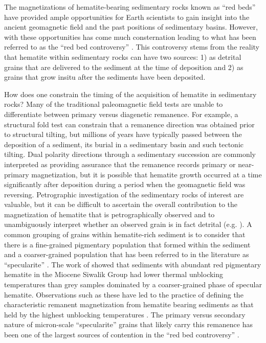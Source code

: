 \documentclass[11pt,letterpaper]{article}
\begin{document}
The magnetizations of hematite-bearing sedimentary rocks known as ``red beds'' have provided ample opportunities for Earth scientists to gain insight into the ancient geomagnetic field and the past positions of sedimentary basins. However, with these opportunities has come much consternation leading to what has been referred to as the ``red bed controversy'' \citep{Butler1992a, Beck2003b, Van-Der-Voo2012a}. This controversy stems from the reality that hematite within sedimentary rocks can have two sources: 1) as detrital grains that are delivered to the sediment at the time of deposition and 2) as grains that grow insitu after the sediments have been deposited.

How does one constrain the timing of the acquisition of hematite in sedimentary rocks? Many of the traditional paleomagnetic field tests are unable to differentiate between primary versus diagenetic remanence. For example, a structural fold test can constrain that a remanence direction was obtained prior to structural tilting, but millions of years have typically passed between the deposition of a sediment, its burial in a sedimentary basin and such tectonic tilting. Dual polarity directions through a sedimentary succession are commonly interpreted as providing assurance that the remanence records primary or near-primary magnetization, but it is possible that hematite growth occurred at a time significantly after deposition during a period when the geomagnetic field was reversing. Petrographic investigation of the sedimentary rocks of interest are valuable, but it can be difficult to ascertain the overall contribution to the magnetization of hematite that is petrographically observed and to unambiguously interpret whether an observed grain is in fact detrital (e.g. \citealp{Elmore1982a}). A common grouping of grains within hematite-rich sediment is to consider that there is a fine-grained pigmentary population that formed within the sediment and a coarser-grained population that has been referred to in the literature as ``specularite'' \citep{Butler1992a, Van-Der-Voo2012a}. The work of \cite{Tauxe1980a} showed that sediments with abundant red pigmentary hematite in the Miocene Siwalik Group had lower thermal unblocking temperatures than grey samples dominated by a coarser-grained phase of specular hematite. Observations such as these have led to the practice of defining the characteristic remanent magnetization from hematite bearing sediments as that held by the highest unblocking temperatures \citep{Van-Der-Voo2012a}.  The primary versus secondary nature of micron-scale ``specularite'' grains that likely carry this remanence has been one of the largest sources of contention in the ``red bed controversy'' \citep{Van-Houten1968a, Tauxe1980a, Butler1992a, Van-Der-Voo2012a}.
\end{document}
